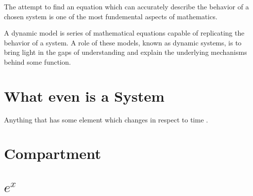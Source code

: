 \documentclass[../../Orator]{subfiles}
\begin{document}
The attempt to find an equation which can accurately describe the behavior of a chosen system is one of the most fundemental aspects of mathematics. 

A dynamic model is series of mathematical equations capable of replicating the behavior of a system. A role of these models, known as dynamic systems, is to bring light in the gaps of understanding and explain the underlying mechanisms behind some function. 

\section{What even is a System}

Anything that has some element which changes in respect to time \cite{}. 



\section{Compartment}



\section{\(e^{x}\)}
\end{document}
